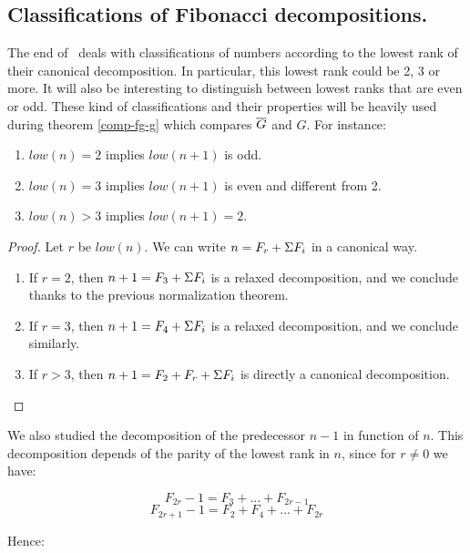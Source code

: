 \documentclass[a4paper,11pt]{article}
\begin{document}
\subsection{Classifications of Fibonacci decompositions.}
The end of \ deals with classifications of numbers
according to the lowest rank of their canonical decomposition.
In particular, this lowest rank could be 2, 3 or more. It will
also be interesting to distinguish between lowest ranks that
are even or odd. These kind of classifications and their
properties will be heavily used
during theorem \ref{comp-fg-g} which compares $\overline{G}$ and $G$.
For instance:
\begin{theorem}\label{fibsucc}
\noindent
\begin{enumerate}
\item $low(n) = 2$ implies $low(n+1)$ is odd.
\item $low(n) = 3$ implies $low(n+1)$ is even and different from 2.
\item $low(n) > 3$ implies $low(n+1) = 2$.
\end{enumerate}
\end{theorem}
\begin{proof}
Let $r$ be $low(n)$. We can write $n = F_r + \Sigma F_i$ in a canonical
way.
\begin{enumerate}
\item If $r = 2$, then $n+1 = F_3 + \Sigma F_i$ is a relaxed decomposition,
  and we conclude thanks to the previous normalization theorem.
\item If $r = 3$, then $n+1 = F_4 + \Sigma F_i$ is a relaxed decomposition,
  and we conclude similarly.
\item If $r > 3$, then $n+1 = F_2 + F_r + \Sigma F_i$ is directly a
  canonical decomposition.
\end{enumerate}
\end{proof}

We also studied the decomposition of the predecessor
$n-1$ in function of $n$. This decomposition depends of the parity of
the lowest rank in $n$, since for $r\neq 0$ we have:

$$ F_{2r} - 1 = F_3 + ... + F_{2r-1}$$
$$ F_{2r+1} - 1 = F_2 + F_4 + ... + F_{2r}$$

Hence:
\end{document}

